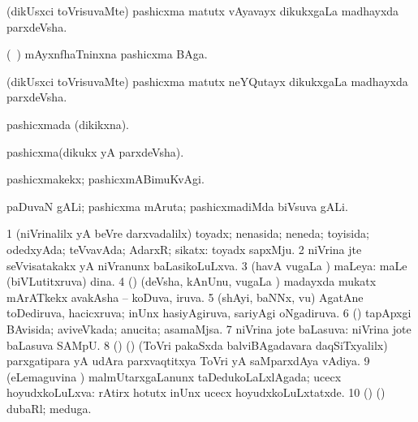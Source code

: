 {{{{{{\bentry
{} 
\gl{\nA}
\expl{}
\bmng
(dikUsxci toVrisuvaMte) pashicxma matutx vAyavayx dikukxgaLa madhayxda parxdeVsha. 
\emng
\eentry

\bentry
{} 
\gl{\nA}
\expl{}
\bmng
(\kanu\ \ame) mAyxnfhaTninxna pashicxma BAga. 
\emng
\eentry

\bentry
{} 
\gl{\nA}
\expl{}
\bmng
(dikUsxci toVrisuvaMte) pashicxma matutx neYQutayx dikukxgaLa madhayxda parxdeVsha. 
\emng
\eentry

\bentry
{} 
\gl{\gu}
\expl{}
\bmng
pashicxmada (dikikxna). 
\emng
\eentry

\bentry
{} 
\gl{\nA}
\expl{}
\bmng
pashicxma(dikukx yA parxdeVsha). 
\emng
\eentry

\bentry
{} 
\gl{\kirxvi}
\expl{}
\bmng
pashicxmakekx; pashicxmABimuKvAgi. 
\emng
\eentry

\bentry
{} 
\gl{\kirxvi}
\expl{}
\bmng
{} 
\emng
\eentry

\bentry
{} 
\gl{\nA}
\expl{}
\bmng
paDuvaN gALi; pashicxma mAruta; pashicxmadiMda biVsuva gALi. 
\emng
\eentry

\bentry
{} 
\gl{\gu}
\bmng
\bnum
\num{1} (niVrinalilx yA beVre darxvadalilx) toyadx; nenasida; neneda; toyisida; odedxyAda; teVvavAda; AdarxR; sikatx:  toyadx sapxMju. 
\num{2} niVrina jte seVvisatakakx yA niVranunx baLasikoLuLxva. 
\num{3} (havA \mo vugaLa \vi) maLeya:  maLe (biVLutitxruva) dina. 
\num{4} (\ashi) (deVsha, kAnUnu, \mo vugaLa \vi) madayxda mukatx mArATkekx avakAsha -- koDuva, iruva. 
\num{5} (shAyi, baNNx, \mo vu) AgatAne toDediruva, hacicxruva; inUnx hasiyAgiruva, sariyAgi oNgadiruva. 
\num{6} (\ashi) tapApxgi BAvisida; aviveVkada; anucita; asamaMjsa. 
\num{7} niVrina jote baLasuva:  niVrina jote baLasuva SAMpU. 
\num{8} (\birx) (\rAshA) (ToVri pakaSxda balviBAgadavara daqSiTxyalilx) parxgatipara yA udAra parxvaqtitxya ToVri yA saMparxdAya vAdiya. 
\num{9} (eLemaguvina \vi) malmUtarxgaLanunx taDedukoLaLxlAgada; ucecx hoyudxkoLuLxva:  rAtirx hotutx inUnx ucecx hoyudxkoLuLxtatxde. 
\num{10} (\birx) (\AmA) dubaRl; meduga. 
\enum
\emng

}}}}}}
